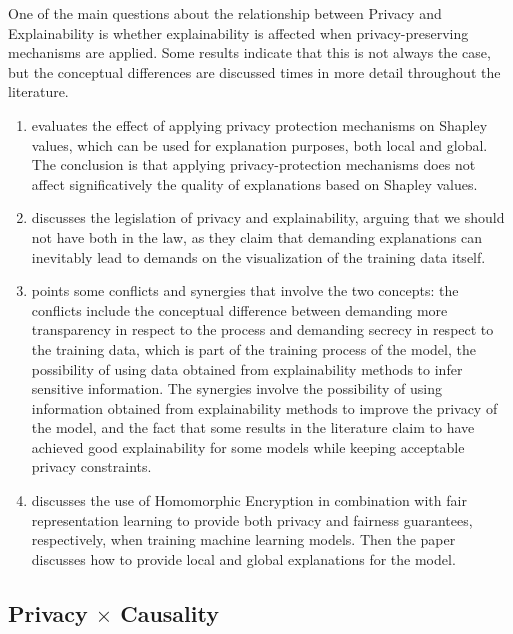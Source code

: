 One of the main questions about the relationship between Privacy and Explainability is whether explainability is affected when privacy-preserving mechanisms are applied. Some results indicate that this is not always the case, but the conceptual differences are discussed times in more detail throughout the literature. 

\begin{enumerate}
\item \cite{bozorgpanah2022privacy} evaluates the effect of applying privacy protection mechanisms on Shapley values, which can be used for explanation purposes, both local and global. The conclusion is that applying privacy-protection mechanisms does not affect significatively the quality of explanations based on Shapley values.
\item \cite{grant2020show} discusses the legislation of privacy and explainability, arguing that we should not have both in the law, as they claim that demanding explanations can inevitably lead to demands on the visualization of the training data itself.
\item \cite{Sok} points some conflicts and synergies that involve the two concepts: the conflicts include the conceptual difference between demanding more transparency in respect to the process and demanding secrecy in respect to the training data, which is part of the training process of the model, the possibility of using data obtained from explainability methods to infer sensitive information. The synergies involve the possibility of using information obtained from explainability methods to improve the privacy of the model, and the fact that some results in the literature claim to have achieved good explainability for some models while keeping acceptable privacy constraints.
\item \cite{franco2021toward} discusses the use of Homomorphic Encryption in combination with fair representation learning \cite{zemel2013learning} to provide both privacy and fairness guarantees, respectively, when training machine learning models. Then the paper discusses how to provide local and global explanations for the model.
\end{enumerate}


\subsection{Privacy $\times$ Causality}

